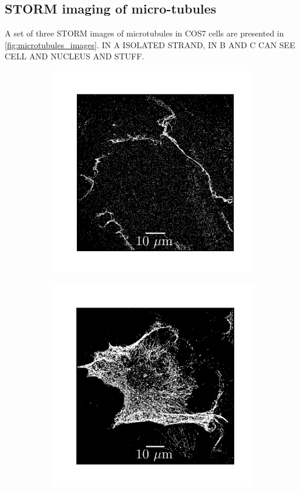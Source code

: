 \subsection{STORM imaging of micro-tubules}
A set of three STORM images of microtubules in COS7 cells are presented in \autoref{fig:microtubules_images}.
IN A ISOLATED STRAND, IN B AND C CAN SEE CELL AND NUCLEUS AND STUFF.
%
\begin{figure}
    \begin{subfigure}{0.32\textwidth}
        \includegraphics[width=\textwidth]{figures/microtubules_image1.png}
        \caption{}
        \label{fig:microtubules_image1}
    \end{subfigure}
    \begin{subfigure}{0.32\textwidth}
        \includegraphics[width=\textwidth]{figures/microtubules_image4.png}

\end{subfigure}
\end{figure}
